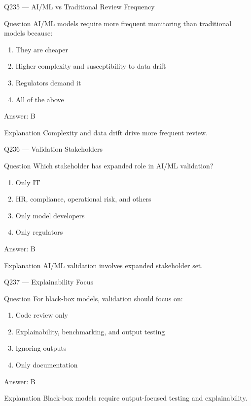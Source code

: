\documentclass[aspectratio=169,8pt]{beamer}
\begin{document}
\begin{frame}{Q235 --- AI/ML vs Traditional Review Frequency}
\begin{block}{Question}
AI/ML models require more frequent monitoring than traditional models because:
\begin{enumerate}
\item They are cheaper
\item Higher complexity and susceptibility to data drift
\item Regulators demand it
\item All of the above
\end{enumerate}
\end{block}
\begin{exampleblock}{Answer: B}\end{exampleblock}
\begin{block}{Explanation}
Complexity and data drift drive more frequent review.
\end{block}
\end{frame}

\begin{frame}{Q236 --- Validation Stakeholders}
\begin{block}{Question}
Which stakeholder has expanded role in AI/ML validation?
\begin{enumerate}
\item Only IT
\item HR, compliance, operational risk, and others
\item Only model developers
\item Only regulators
\end{enumerate}
\end{block}
\begin{exampleblock}{Answer: B}\end{exampleblock}
\begin{block}{Explanation}
AI/ML validation involves expanded stakeholder set.
\end{block}
\end{frame}

\begin{frame}{Q237 --- Explainability Focus}
\begin{block}{Question}
For black-box models, validation should focus on:
\begin{enumerate}
\item Code review only
\item Explainability, benchmarking, and output testing
\item Ignoring outputs
\item Only documentation
\end{enumerate}
\end{block}
\begin{exampleblock}{Answer: B}\end{exampleblock}
\begin{block}{Explanation}
Black-box models require output-focused testing and explainability.
\end{block}
\end{frame}
\end{document}
